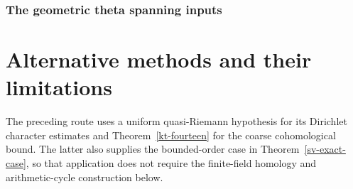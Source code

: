\section{The geometric theta spanning inputs}







































\appendix
\part{Alternative methods and their limitations}

The preceding route uses a uniform quasi-Riemann hypothesis for its
Dirichlet character estimates and Theorem~\ref{kt-fourteen} for the coarse
cohomological bound.  The latter also supplies the bounded-order case in
Theorem~\ref{sv-exact-case}, so that application does not require the
finite-field homology and arithmetic-cycle construction below.

